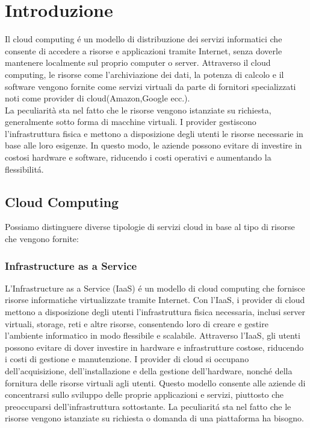 \documentclass[../../main.tex]{subfiles}
\begin{document}
    
\chapter{Introduzione}

Il cloud computing é un modello di distribuzione dei servizi informatici che consente di accedere a risorse e applicazioni tramite Internet, senza doverle mantenere localmente sul proprio computer o server. 
Attraverso il cloud computing, le risorse come l'archiviazione dei dati, la potenza di calcolo e il software vengono fornite come servizi virtuali da parte di fornitori specializzati noti come provider di cloud(Amazon,Google ecc.).\\
La peculiarità sta nel fatto che le risorse vengono istanziate su richiesta, generalmente sotto forma di macchine virtuali.
I provider gestiscono l'infrastruttura fisica e mettono a disposizione degli utenti le risorse necessarie in base alle loro esigenze. In questo modo, le aziende possono evitare di investire in costosi hardware e software, riducendo i costi operativi e aumentando la flessibilitá.

\section{Cloud Computing}
Possiamo distinguere diverse tipologie di servizi cloud in base al tipo di risorse che vengono fornite:
\subsection{Infrastructure as a Service}
L'Infrastructure as a Service (IaaS) é un modello di cloud computing che fornisce risorse informatiche virtualizzate tramite Internet. Con l'IaaS, i provider di cloud mettono a disposizione degli utenti l'infrastruttura fisica necessaria, inclusi server virtuali, storage, reti e altre risorse, consentendo loro di creare e gestire l'ambiente informatico in modo flessibile e scalabile.
Attraverso l'IaaS, gli utenti possono evitare di dover investire in hardware e infrastrutture costose, riducendo i costi di gestione e manutenzione. I provider di cloud si occupano dell'acquisizione, dell'installazione e della gestione dell'hardware, nonché della fornitura delle risorse virtuali agli utenti. Questo modello consente alle aziende di concentrarsi sullo sviluppo delle proprie applicazioni e servizi, piuttosto che preoccuparsi dell'infrastruttura sottostante.
La peculiaritá sta nel fatto che le risorse vengono istanziate su richiesta o domanda di una piattaforma ha bisogno.
\end{document}
